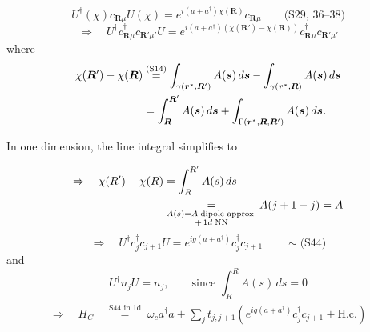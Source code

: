 \documentclass[../../main.tex]{subfiles}
\begin{document}
\begin{equation}
U^\dagger(\chi)c_{\bm R\mu}U(\chi)
=e^{i(a+a^\dagger)\chi(\bm R)}c_{\bm R\mu}
\qquad\text{(S29, 36--38)}
\label{eq:passetti2022-local-phase}
\end{equation}
\begin{equation}
\Rightarrow\quad U^\dagger c_{\bm R\mu}^\dagger c_{\bm R'\mu'}U
=e^{i(a+a^\dagger)(\chi(\bm R')-\chi(\bm R))}
c_{\bm R\mu}^\dagger c_{\bm R'\mu'}
\end{equation}
where
\begin{align}
\chi(\bm R')-\chi(\bm R)
&\overset{\text{(S14)}}{=}
\int_{\gamma(\bm r^*,\bm R')}A(\bm s)\,d\bm s
-\int_{\gamma(\bm r^*,\bm R)}A(\bm s)\,d\bm s
\notag\\
&=\int_{\bm R}^{\bm R'}A(\bm s)\,d\bm s
+\int_{\Gamma(\bm r^*,\bm R,\bm R')}A(\bm s)\,d\bm s.
\label{eq:passetti2022-path-difference}
\end{align}


In one dimension, the line integral simplifies to 

\begin{align}
\Rightarrow\quad\chi(R')-\chi(R)
&=\int_R^{R'}A(s)\,ds
\notag\\
&\underset{\substack{A(s)=A\;\text{dipole approx.}\\+\,1d\;\mathrm{NN}}}{=}
A(j+1-j)=A
\end{align}
\begin{equation}
\Rightarrow\quad U^\dagger c_j^\dagger c_{j+1}U
=e^{ig(a+a^\dagger)}c_j^\dagger c_{j+1}
\qquad\sim\text{(S44)}
\end{equation}
and
\begin{equation}
U^\dagger n_j U=n_j,\qquad\text{since }\int_R^R A(s)\,ds=0
\end{equation}
\begin{equation}
\begin{aligned}
\Rightarrow\quad H_C
&\overset{\substack{\text{S44 in 1d}}}{=}
\omega_c a^\dagger a
+\sum_j t_{j,j+1}\left(
e^{ig(a+a^\dagger)}c_j^\dagger c_{j+1}+\mathrm{H.c.}\right)
\end{aligned}
\label{eq:passetti2022-coulomb}
\end{equation}
\end{document}
